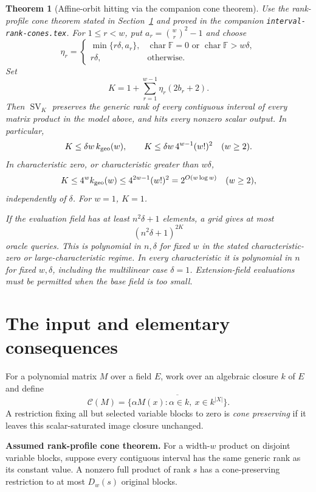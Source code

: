 \documentclass[11pt]{article}
\newtheorem{theorem}{Theorem}
\newcommand{\F}{\mathbb F}
\newcommand{\SV}{\operatorname{SV}}
\begin{document}
\begin{theorem}[Affine-orbit hitting via the companion cone theorem]\label{thm:orbit}
Use the rank-profile cone theorem stated in Section~\ref{sec:input}
and proved in the companion \texttt{interval-rank-cones.tex}.
For $1\le r<w$, put $a_r=\binom wr^2-1$ and choose
\[
 \eta_r=
 \begin{cases}
 \min\{r\delta,a_r\},&
  \operatorname{char}\F=0\text{ or }\operatorname{char}\F>w\delta,\\
 r\delta,&\text{otherwise}.
 \end{cases}
\]
Set
\[
 K=1+\sum_{r=1}^{w-1}\eta_r(2b_r+2).
\]
Then $\SV_K$ preserves the generic rank of every contiguous interval of
every matrix product in the model above, and hits every nonzero scalar
output. In particular,
\[
 K\le \delta w\,k_{\rm geo}(w),
 \qquad
 K\le \delta w\,4^{w-1}(w!)^2\quad(w\ge2).
\]
In characteristic zero, or characteristic greater than $w\delta$,
\[
 K\le4^w k_{\rm geo}(w)
   \le4^{2w-1}(w!)^2=2^{O(w\log w)}\quad(w\ge2),
\]
independently of $\delta$.
For $w=1$, $K=1$.

If the evaluation field has at least $n^2\delta+1$ elements, a grid gives
at most
\[
 (n^2\delta+1)^{2K}
\]
oracle queries. This is polynomial in $n,\delta$ for fixed $w$ in the
stated characteristic-zero or large-characteristic regime. In every
characteristic it is polynomial in $n$ for fixed $w,\delta$, including
the multilinear case $\delta=1$. Extension-field evaluations must be
permitted when the base field is too small.
\end{theorem}

\section{The input and elementary consequences}\label{sec:input}

For a polynomial matrix $M$ over a field $E$, work over an algebraic
closure $k$ of $E$ and define
\[
 \mathcal C(M)=
 \overline{\{\alpha M(x):\alpha\in k,\ x\in k^{|X|}\}}.
\]
A restriction fixing all but selected variable blocks to zero is
\emph{cone preserving} if it leaves this scalar-saturated image closure
unchanged.

\medskip
\noindent\textbf{Assumed rank-profile cone theorem.}
For a width-$w$ product on disjoint variable blocks, suppose every
contiguous interval has the same generic rank as its constant value.
A nonzero full product of rank $s$ has a cone-preserving restriction to
at most $D_w(s)$ original blocks.
\medskip
\end{document}
